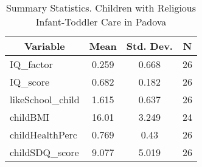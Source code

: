 
\begin{table}[htbp]\centering \caption{Summary Statistics. Children with Religious Infant-Toddler Care in Padova \label{bothChildasiloReliPadova}}
\begin{tabular}{l c c  c}\hline\hline
\multicolumn{1}{c}{\textbf{Variable}} & \textbf{Mean}
 & \textbf{Std. Dev.} & \textbf{N}\\ \hline
IQ\_factor & 0.259 & 0.668  & 26\\
IQ\_score & 0.682 & 0.182  & 26\\
likeSchool\_child & 1.615 & 0.637  & 26\\
childBMI & 16.01 & 3.249  & 24\\
childHealthPerc & 0.769 & 0.43  & 26\\
childSDQ\_score & 9.077 & 5.019  & 26\\
\hline\end{tabular}
\end{table}
